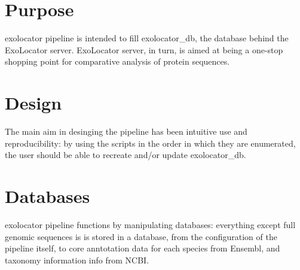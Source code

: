 \hypertarget{index_Purpose}{}\section{Purpose}\label{index_Purpose}
exolocator pipeline is intended to fill exolocator\-\_\-db, the database behind the Exo\-Locator server.  Exo\-Locator server, in turn, is aimed at being a one-\/stop shopping point for comparative  analysis of protein sequences.  \hypertarget{index_Design}{}\section{Design}\label{index_Design}
The main aim in desinging the pipeline has been intuitive use and reproducibility\-:  by using the scripts in the order in which they are enumerated, the user should be able to  recreate and/or update exolocator\-\_\-db.  \hypertarget{index_Databases}{}\section{Databases}\label{index_Databases}
exolocator pipeline functions by manipulating databases\-: everything except full genomic sequences is  is stored in a database, from the configuration of the pipeline itself, to core anntotation data for each species  from Ensembl, and taxonomy information info from N\-C\-B\-I. 